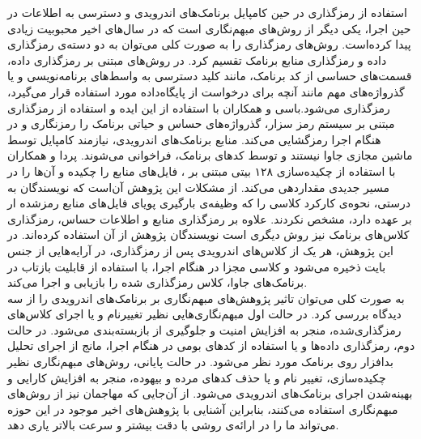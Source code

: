 استفاده از رمزگذاری در حین کامپایل برنامک‌های اندرویدی و دسترسی به اطلاعات در حین اجرا، یکی دیگر از روش‌های مبهم‌نگاری است که در سال‌های اخیر محبوبیت زیادی پیدا کرده‌است. روش‌های رمز‌گذاری را به صورت کلی می‌توان به دو دسته‌ی رمز‌گذاری داده و رمزگذاری منابع برنامک تقسیم کرد. در روش‌های مبتنی بر رمز‌گذاری داده، قسمت‌های حساسی از کد برنامک، مانند کلید‌ دسترسی به واسط‌های برنامه‌نویسی و یا گذرواژه‌های مهم مانند آنچه برای درخواست از پایگاه‌داده مورد استفاده قرار می‌گیرد، رمز‌گذاری می‌شود.باسی و همکاران با استفاده از این ایده و استفاده از رمز‌گذاری مبتنی بر سیستم رمز سزار، گذرواژه‌های حساس و حیاتی برنامک را رمزنگاری و در هنگام اجرا رمز‌گشایی می‌کند. منابع برنامک‌های اندرویدی، نیازمند کامپایل توسط ماشین مجازی جاوا نیستند و توسط کد‌های برنامک، فراخوانی می‌شوند. پردا و همکاران با استفاده از چکیده‌سازی ۱۲۸ بیتی مبتنی بر ، فایل‌های منابع را چکیده و آن‌ها را در مسیر جدیدی مقدار‌دهی می‌کند. از مشکلات این پژوهش آن‌است که نویسندگان به درستی، نحوه‌ی کارکرد کلاسی را که وظیفه‌ی بارگیری پویای فایل‌های منابع رمزشده ار بر عهده دارد، مشخص نکردند. علاوه بر رمز‌گذاری منابع و اطلاعات حساس، رمز‌گذاری کلاس‌های برنامک نیز روش دیگری است نویسندگان پژوهش از آن استفاده کرده‌اند. در این پژوهش، هر یک از کلاس‌های اندرویدی پس از رمز‌گذاری، در آرایه‌هایی از جنس بایت ذخیره می‌شود و کلاسی مجزا در هنگام اجرا، با استفاده از قابلیت بازتاب در برنامک‌های جاوا، کلاس رمز‌گذاری شده را بازیابی و اجرا می‌کند.\\
به صورت کلی می‌توان تاثیر پژوهش‌های مبهم‌نگاری بر برنامک‌های اندرویدی را از سه دید‌گاه بررسی کرد. در حالت اول مبهم‌نگاری‌هایی نظیر تغییرنام و یا اجرای کلاس‌های رمز‌گذاری‌شده، منجر به افزایش امنیت و جلوگیری از بازبسته‌بندی می‌شود. در حالت دوم، رمز‌گذاری داده‌ها و یا استفاده از کد‌های بومی در هنگام اجرا، مانج از اجرای تحلیل بدافزار روی برنامک مورد نظر می‌شود. در حالت پایانی، روش‌های مبهم‌نگاری نظیر چکیده‌سازی، تغییر نام و یا حذف کد‌های مرده و بیهوده، منجر به افزایش کارایی و بهینه‌شدن اجرای برنامک‌های اندرویدی می‌شود. از آن‌جایی که مهاجمان نیز از روش‌های مبهم‌نگاری استفاده می‌کنند، بنابراین آشنایی با پژوهش‌های اخیر موجود در این حوزه می‌تواند ما را در ارائه‌ی روشی با دقت بیشتر و سرعت بالاتر یاری دهد.
